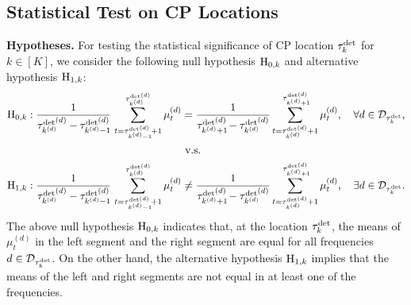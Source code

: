 \subsection{Statistical Test on CP Locations}
%
\textbf{Hypotheses.}
For testing the statistical significance of CP location $\tau^{\rm det}_k$ for $k \in [K]$, we consider the following null hypothesis ${\rm H}_{0, k}$ and alternative hypothesis ${\rm H}_{1, k}$:
% 
\begin{align}
 {\rm H}_{0, k}: 
 \frac{1}{{\tau_{k^{(d)}}^{\text{det}}}^{\hspace{-0.7mm}(d)} - {\tau_{k^{(d)}-1}^{\rm det}}^{\hspace{-4.3mm}(d)}} \,
 \sum_{t={\tau_{k^{(d)}-1}^{\rm det}}^{\hspace{-4.3mm}(d)} \, +1}^{{\tau_{k^{(d)}}^{\text{det}}}^{\hspace{-1.2mm}(d)}}
 \mu_t^{(d)}
 &= 
 \frac{1}{{\tau_{k^{(d)}+1}^{\rm det}}^{\hspace{-4.3mm}(d)} - {\tau_{k^{(d)}}^{\text{det}}}^{\hspace{-0.7mm}(d)}}
 \sum_{t={\tau_{k^{(d)}}^{\text{det}}}^{\hspace{-1.2mm}(d)} +1}^{{\tau_{k^{(d)}+1}^{\rm det}}^{\hspace{-4.3mm}(d)}}
 \mu_t^{(d)}, ~~~
 \forall d \in \mathcal{D}_{\tau_k^{\rm det}}, \label{eq:H0}
 \\
 &\text{~v.s.} \notag \\
 {\rm H}_{1, k}:
 \frac{1}{{\tau_{k^{(d)}}^{\text{det}}}^{\hspace{-0.7mm}(d)} - {\tau_{k^{(d)}-1}^{\rm det}}^{\hspace{-4.3mm}(d)}} \,
 \sum_{t={\tau_{k^{(d)}-1}^{\rm det}}^{\hspace{-4.3mm}(d)} \, +1}^{{\tau_{k^{(d)}}^{\text{det}}}^{\hspace{-1.2mm}(d)}}
 \mu_t^{(d)}
 &\neq
 \frac{1}{{\tau_{k^{(d)}+1}^{\rm det}}^{\hspace{-4.3mm}(d)} - {\tau_{k^{(d)}}^{\text{det}}}^{\hspace{-0.7mm}(d)}}
 \sum_{t={\tau_{k^{(d)}}^{\text{det}}}^{\hspace{-1.2mm}(d)} +1}^{{\tau_{k^{(d)}+1}^{\rm det}}^{\hspace{-4.3mm}(d)}}
 \mu_t^{(d)}, ~~~
 \exists d \in \mathcal{D}_{\tau_k^{\rm det}}. \label{eq:H1}
\end{align}
%
The above null hypothesis ${\rm H}_{0, k}$ indicates that, at the location $\tau_k^{\rm det}$, the means of $\mu_t^{(d)}$ in the left segment and the right segment are equal for all frequencies $d \in \mathcal{D}_{\tau_k^{\rm det}}$.
%
On the other hand, the alternative hypothesis ${\rm H}_{1, k}$ implies that the means of the left and right segments are not equal in at least one of the frequencies.

